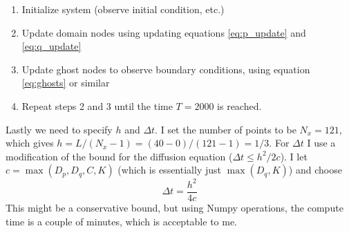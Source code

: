 \documentclass[a4paper,10pt]{article}
\begin{document}
	\begin{enumerate}
		\item Initialize system (observe initial condition, etc.)
		\item Update domain nodes using updating equations \ref{eq:p_update} and \ref{eq:q_update}
		\item Update ghost nodes to observe boundary conditions, using equation \ref{eq:ghosts} or similar
		\item Repeat steps 2 and 3 until the time $ T=2000 $ is reached.
	\end{enumerate}
	Lastly we need to specify $ h $ and $ \Delta t $. I set the number of points to be $ N_x=121 $, which gives $ h = L/(N_x-1) = (40-0)/(121-1) =  1/3 $. For $ \Delta t $ I use a modification of the bound for the diffusion equation ($ \Delta t \leq h^2/2c $). I let $ c = \max (D_p, D_q, C, K) $ (which is essentially just $ \max(D_q, K) $) and choose
	\begin{equation}\label{key}
		\Delta t = \frac{h^2}{4c}
	\end{equation}
	This might be a conservative bound, but using Numpy operations, the compute time is a couple of minutes, which is acceptable to me.
	
\end{document}
